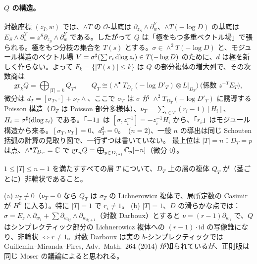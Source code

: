 \paragraph{$Q$ の構造。}
対数座標 $(z_I,w)$ では、$\wedge T$ の $\mathcal O$-基底は $\partial_{z_S}\wedge\partial_w^Y$、$\wedge T(-\log D)$ の基底は $E_S\wedge\partial_w^Y=z^S\partial_{z_S}\wedge\partial_w^Y$ である。したがって $Q$ は「極をもつ多重ベクトル場」で張られる。極をもつ分枝の集合を $T(s)$ とする。$\sigma\in\wedge^2T(-\log D)$ と、モジュール構造のベクトル場 $V=\sigma^\sharp(\sum r_i\,\mathrm{dlog}\, z_i)\in T(-\log D)$ のために、$d$ は極を新しく作らない。よって $F_k=\{|T(s)|\le k\}$ は $Q$ の部分複体の増大列で、その次数商は
\[\mathrm{gr}_kQ=\bigoplus_{|T|=k}Q_T,\qquad Q_T\cong\bigl(\wedge^\bullet T_{D_T}(-\log D'_T)\otimes L|_{D_T}\bigr)\ \text{(係数 }z^{-T}E_T\text{)},\]
微分は $d_T=[\sigma_T,\cdot]+\nu_T\wedge$、ここで $\sigma_T$ は $\sigma$ が $\wedge^2T_{D_T}(-\log D'_T)$ に誘導する Poisson 構造（$D_T$ は Poisson 部分多様体）、$\nu_T=\sum_{i\in T}(r_i-1)[H_i]$、$H_i=\sigma^\sharp(\mathrm{dlog}\, z_i)$ である。「$-1$」は $[\sigma,z_i^{-1}]=-z_i^{-1}H_i$ から、「$r_i$」はモジュール構造から来る。$[\sigma_T,\nu_T]=0$、$d_T^2=0$。\tP\ ($n=2$)、一般 $n$ の導出は同じ Schouten 括弧の計算の見取り図で、一行ずつは書いていない\tQ。
最上位は $|T|=n$：$D_T=p$ は点、$\wedge^\bullet T_{D_T}=\mathbb C$ で $\mathrm{gr}_nQ=\bigoplus_{p\in D_{(n)}}\mathbb C_p[-n]$（微分 0）。\tP

\begin{defn}[(GEN$'$)]\label{def:GEN}
$1\le|T|\le n-1$ を満たすすべての層 $T$ について、$D_T$ 上の層の複体 $Q_T$ が（茎ごとに）非輪状であること。
\end{defn}
\begin{prop}\tP\label{prop:genNec}
(a) $\nu_T\not\equiv0$（$\nu_T\equiv0$ なら $Q_T$ は $\sigma_T$ の Lichnerowicz 複体で、局所定数の Casimir が $H^0$ に入る）。特に $|T|=1$ で $r_i\neq1$。
(b) $|T|=1$、$D$ の滑らかな点では：$\sigma=E_z\wedge\partial_{w_1}+\sum\partial_{w_{2j}}\wedge\partial_{w_{2j+1}}$（対数 Darboux）とすると $\nu=(r-1)\partial_{w_1}$ で、$Q$ はシンプレクティック部分の Lichnerowicz 複体への $(r-1)\cdot\mathrm{id}$ の写像錐になり、非輪状 $\iff r\neq1$。対数 Darboux は実の $b$-シンプレクティックでは Guillemin--Miranda--Pires, Adv.\ Math.\ 264 (2014) が知られているが、正則版は同じ Moser の議論によると思われる\tQ。
\end{prop}

